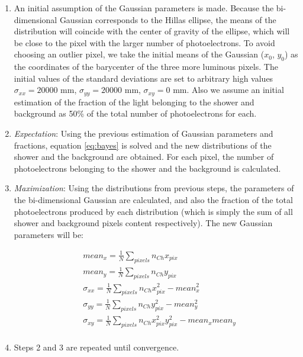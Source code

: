 \documentclass[main.tex]{subfiles}
\begin{document}
\begin{enumerate}
\item An initial assumption of the Gaussian parameters is made. Because the bi-dimensional Gaussian corresponds to the Hillas ellipse, the means of the distribution will coincide with the center of gravity of the ellipse, which will be close to the pixel with the larger number of photoelectrons. To avoid choosing an outlier pixel, we take the initial means of the Gaussian ($x_0$, $y_0$) as the coordinates of the barycenter of the three more luminous pixels. The initial values of the standard deviations are set to arbitrary high values $\sigma_{xx}=20000$ mm, $\sigma_{yy}=20000$ mm, $\sigma_{xy}=0$ mm. Also we assume an initial estimation of the fraction of the light belonging to the shower and background as 50\% of the total number of photoelectrons for each.

\item \textit{Expectation}: Using the previous estimation of Gaussian parameters and fractions, equation \ref{eq:bayes} is solved and the new distributions of the shower and the background are obtained. For each pixel, the number of photoelectrons belonging to the shower and the background is calculated.

\item \textit{Maximization}: Using the distributions from previous steps, the parameters of the bi-dimensional Gaussian are calculated, and also the fraction of the total photoelectrons produced by each distribution (which is simply the sum of all shower and background pixels content respectively). The new Gaussian parameters will be:

  \begin{equation}
    \begin{split}
      & mean_{x} = \frac{1}{N}\sum_{pixels} n_{Ch} x_{pix}\\
      & mean_{y} = \frac{1}{N}\sum_{pixels} n_{Ch} y_{pix}\\
      & \sigma_{xx} = \frac{1}{N}\sum_{pixels} n_{Ch} x_{pix}^{2} - mean_{x}^2\\
      & \sigma_{yy} = \frac{1}{N}\sum_{pixels} n_{Ch} y_{pix}^{2} - mean_{y}^2\\
      & \sigma_{xy} = \frac{1}{N}\sum_{pixels} n_{Ch} x_{pix}^{2} y_{pix}^{2} - mean_{x}mean_{y}\\
    \end{split}
  \end{equation}
\item Steps 2 and 3 are repeated until convergence.\\

\end{enumerate}
\end{document}
